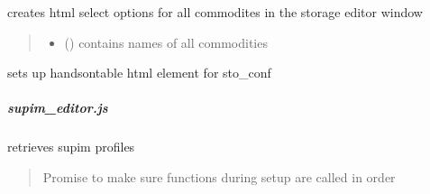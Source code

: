 \documentclass[letterpaper,10pt,english]{sphinxmanual}
\begin{document}

\begin{fulllineitems}
\label{\detokenize{docs_gui/js_api/urbs_editor/storage_editor:fillStorageEditorCommodityList}}
\pysigstartsignatures
{}
\pysigstopsignatures
\sphinxAtStartPar
creates html select options for all commodites in the storage editor window
\begin{quote}\begin{description}
\begin{itemize}
\item {} 
\sphinxAtStartPar
{} () \textendash{} contains names of all commodities

\end{itemize}

\end{description}\end{quote}

\end{fulllineitems}


\begin{fulllineitems}
\label{\detokenize{docs_gui/js_api/urbs_editor/storage_editor:createSto_ConfEditor}}
\pysigstartsignatures
{}
\pysigstopsignatures
\sphinxAtStartPar
sets up handsontable html element for sto\_conf

\end{fulllineitems}


\sphinxstepscope


\subparagraph{supim\_editor.js}
\label{\detokenize{docs_gui/js_api/urbs_editor/supim_editor:supim-editor-js}}\label{\detokenize{docs_gui/js_api/urbs_editor/supim_editor::doc}}

\begin{fulllineitems}
\label{\detokenize{docs_gui/js_api/urbs_editor/supim_editor:fetchSupimProfiles}}
\pysigstartsignatures
{}
\pysigstopsignatures
\sphinxAtStartPar
retrieves supim profiles
\begin{quote}\begin{description}
\sphinxAtStartPar
Promise to make sure functions during setup are called in order

\end{description}\end{quote}

\end{fulllineitems}
\end{document}
